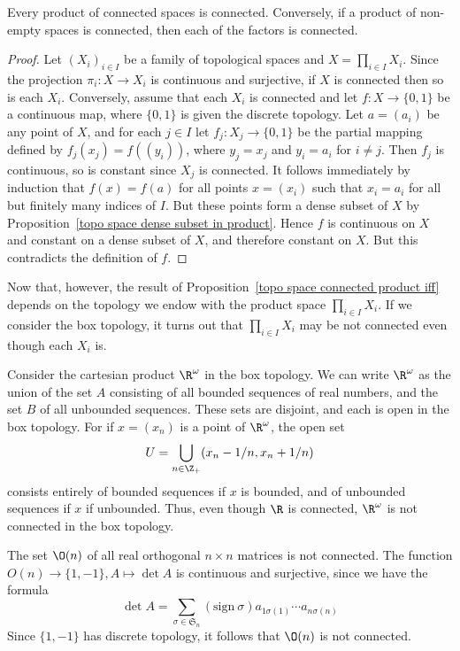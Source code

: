 \begin{proposition}\label{topo space connected product iff}
Every product of connected spaces is connected. Conversely, if a product of non-empty spaces is connected, then each of the factors is connected.
\end{proposition}
\begin{proof}
Let $(X_i)_{i\in I}$ be a family of topological spaces and $X=\prod_{i\in I}X_i$. Since the projection $\pi_i:X\to X_i$ is continuous and surjective, if $X$ is connected then so is each $X_i$. Conversely, assume that each $X_i$ is connected and let $f:X\to\{0,1\}$ be a continuous map, where $\{0,1\}$ is given the discrete topology. Let $a=(a_i)$ be any point of $X$, and for each $j\in I$ let $f_j:X_j\to\{0,1\}$ be the partial mapping defined by $f_j(x_j)=f((y_i))$, where $y_j=x_j$ and $y_i=a_i$ for $i\neq j$. Then $f_j$ is continuous, so is constant since $X_j$ is connected. It follows immediately by induction that $f(x)=f(a)$ for all points $x=(x_i)$ such that $x_i=a_i$ for all but finitely many indices of $I$. But these points form a dense subset of $X$ by Proposition~\ref{topo space dense subset in product}. Hence $f$ is continuous on $X$ and constant on a dense subset of $X$, and therefore constant on $X$. But this contradicts the definition of $f$.
\end{proof}
Now that, however, the result of Proposition~\ref{topo space connected product iff} depends on the topology we endow with the product space $\prod_{i\in I}X_i$. If we consider the box topology, it turns out that $\prod_{i\in I}X_i$ may be not connected even though each $X_i$ is.
\begin{example}
Consider the cartesian product $\R^\omega$ in the box topology. We can write $\R^\omega$ as the union of the set $A$ consisting of all bounded sequences of real numbers, and the set $B$ of all unbounded sequences. These sets are disjoint, and each is open in the box topology. For if $x=(x_n)$ is a point of $\R^\omega$, the open set
\[U=\bigcup_{n\in\Z_+}(x_n-1/n,x_n+1/n)\]
consists entirely of bounded sequences if $x$ is bounded, and of unbounded sequences if $x$ if unbounded. Thus, even though $\R$ is connected, $\R^\omega$ is not connected in the box topology.
\end{example}
\begin{example}
The set $\O(n)$ of all real orthogonal $n\times n$ matrices is not connected. The function $O(n)\to \{1,-1\}, A\mapsto\det A$ is continuous and surjective, since we have the formula
\[\det A=\sum_{\sigma\in\mathfrak{S}_n}(\text{sign}\ \sigma)a_{1\sigma(1)}\cdots a_{n\sigma(n)}\]
Since $\{1,-1\}$ has discrete topology, it follows that $\O(n)$ is not connected.
\end{example}
